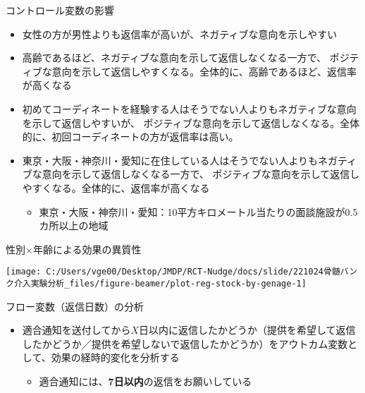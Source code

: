 \documentclass[
      aspectratio=169,
        12pt,
    ]{beamer}
\renewcommand{\textbf}[1]{{\color{DarkBlue}\bfseries#1}}
\providecommand{\tightlist}{%
  \setlength{\itemsep}{0pt}\setlength{\parskip}{0pt}}
\begin{document}
\begin{frame}{コントロール変数の影響}
\protect\hypertarget{ux30b3ux30f3ux30c8ux30edux30fcux30ebux5909ux6570ux306eux5f71ux97ff}{}
\begin{itemize}
\tightlist
\item
  女性の方が男性よりも返信率が高いが、ネガティブな意向を示しやすい
\item
  高齢であるほど、ネガティブな意向を示して返信しなくなる一方で、
  ポジティブな意向を示して返信しやすくなる。全体的に、高齢であるほど、返信率が高くなる
\item
  初めてコーディネートを経験する人はそうでない人よりもネガティブな意向を示して返信しやすいが、
  ポジティブな意向を示して返信しなくなる。全体的に、初回コーディネートの方が返信率は高い。
\item
  東京・大阪・神奈川・愛知に在住している人はそうでない人よりもネガティブな意向を示して返信しなくなる一方で、
  ポジティブな意向を示して返信しやすくなる。全体的に、返信率が高くなる

  \begin{itemize}
  \tightlist
  \item
    東京・大阪・神奈川・愛知：10平方キロメートル当たりの面談施設が0.5カ所以上の地域
  \end{itemize}
\end{itemize}
\end{frame}

\begin{frame}{性別×年齢による効果の異質性}
\protect\hypertarget{ux6027ux5225ux5e74ux9f62ux306bux3088ux308bux52b9ux679cux306eux7570ux8ceaux6027}{}
\begin{center}\texttt{[image: C:/Users/vge00/Desktop/JMDP/RCT-Nudge/docs/slide/221024骨髄バンク介入実験分析\_files/figure-beamer/plot-reg-stock-by-genage-1]} \end{center}
\end{frame}

\begin{frame}{フロー変数（返信日数）の分析}
\protect\hypertarget{ux30d5ux30edux30fcux5909ux6570ux8fd4ux4fe1ux65e5ux6570ux306eux5206ux6790}{}
\begin{itemize}
\tightlist
\item
  適合通知を送付してから\(X\)日以内に返信したかどうか（提供を希望して返信したかどうか／提供を希望しないで返信したかどうか）をアウトカム変数として、効果の経時的変化を分析する

  \begin{itemize}
  \tightlist
  \item
    適合通知には、\textbf{7日以内}の返信をお願いしている
  \end{itemize}
\end{itemize}
\end{frame}
\end{document}

